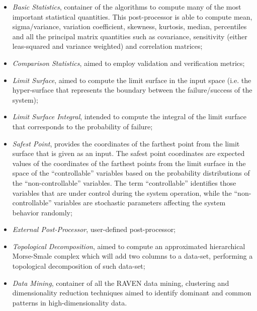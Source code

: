 \begin{itemize}
 \item \textit{Basic Statistics}, container of the algorithms to compute many of the most important statistical quantities. This post-processor is able to compute mean, sigma/variance, variation coefficient, skewness, kurtosis, median, percentiles and all the principal matrix quantities such as covariance, sensitivity (either leas-squared and variance weighted) and correlation matrices;
 \item \textit{Comparison Statistics}, aimed to employ validation and verification metrics;
 \item \textit{Limit Surface}, aimed to compute the limit surface in the input space (i.e. the hyper-surface that represents the boundary between the failure/success of the system);
 \item \textit{Limit Surface Integral}, intended to compute the integral of the limit surface that corresponds to the probability of failure;
  \item \textit{Safest Point}, provides the coordinates of the farthest point from the limit surface that is given as an input. The safest point coordinates are expected values of the coordinates of the farthest points from the limit surface in the space of the ``controllable'' variables based on the probability distributions of the ``non-controllable'' variables. The term ``controllable'' identifies those variables that are under control during the system operation, while the ``non-controllable'' variables are stochastic parameters affecting the system behavior randomly;
 \item \textit{External Post-Processor}, user-defined post-processor;
 \item \textit{Topological Decomposition}, aimed to compute an approximated hierarchical Morse-Smale complex which will add two columns to a data-set, performing a topological decomposition of such data-set;
 \item \textit{Data Mining}, container of all the RAVEN data mining, clustering and dimensionality reduction techniques aimed to identify dominant and common patterns in high-dimensionality data.
\end{itemize}
